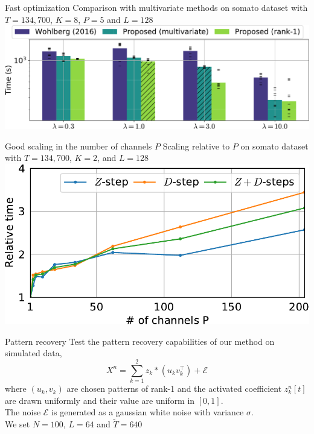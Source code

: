 \documentclass{beamer}
\def\tT{\widetilde{T}}
\begin{document}
\begin{frame}{Fast optimization}
Comparison with multivariate methods on somato dataset with $T=134,700$, $K=8$, $P=5$ and $L=128$\\[1em]
\includegraphics[width=\textwidth]{all_last_0001_T_13470_P5_K8_L128}
\end{frame}

\begin{frame}{Good scaling in the number of channels $P$}
Scaling relative to $P$ on somato dataset with $T=134,700$, $K=2$, and $L=128$\\[1em]
\includegraphics[width=\textwidth]{scaling_channels_reg0_001_mean_rank1_K2_L128.pdf}
\end{frame}

\begin{frame}{Pattern recovery}
Test the pattern recovery capabilities of our method on simulated data,
\[
	X^n = \sum_{k=1}^2 z_k * (u_kv_k^\top) + \mathcal E
\]
where $(u_k, v_k)$ are chosen patterns of rank-1 and the activated coefficient $z^n_k[t]$ are drawn uniformly and their value are uniform in $[0, 1]$.\\[1em]
The noise $\mathcal E$ is generated as a gaussian white noise with variance $\sigma$.\\[1em]

We set $N=100$, $L=64$ and $\tT=640$
\end{frame}
\end{document}
